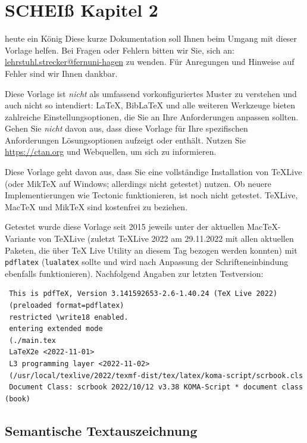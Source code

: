 

\lstset{language=C}

\chapter{SCHEIß Kapitel 2 }

heute ein König
Diese kurze Dokumentation soll Ihnen beim Umgang mit dieser Vorlage helfen. Bei Fragen oder Fehlern bitten wir Sie, sich an: \href{mailto:lehrstuhl.strecker@fernuni-hagen}{lehrstuhl.strecker@fernuni-hagen} zu wenden. Für Anregungen und Hinweise auf Fehler sind wir Ihnen dankbar.

Diese Vorlage ist \emph{nicht} als umfassend vorkonfiguriertes Muster zu verstehen und auch nicht so intendiert: LaTeX, BibLaTeX und alle weiteren Werkzeuge bieten zahlreiche Einstellungsoptionen, die Sie an Ihre Anforderungen anpassen sollten. Gehen Sie \emph{nicht} davon aus, dass diese Vorlage für Ihre spezifischen Anforderungen Lösungsoptionen aufzeigt oder enthält. Nutzen Sie \url{https://ctan.org} und Webquellen, um sich zu informieren.

Diese Vorlage geht davon aus, dass Sie eine vollständige Installation von TeXLive (oder MikTeX auf Windows; allerdings nicht getestet) nutzen. Ob neuere Implementierungen wie Tectonic funktionieren, ist noch nicht getestet. TeXLive, MacTeX und MikTeX sind kostenfrei zu beziehen.

Getestet wurde diese Vorlage seit 2015 jeweils unter der aktuellen MacTeX-Variante von TeXLive (zuletzt TeXLive 2022 am 29.11.2022 mit allen aktuellen Paketen, die über TeX Live Utility an diesem Tag bezogen werden konnten) mit \verb|pdflatex| (\verb|lualatex| sollte und wird nach Anpassung der Schrifteneinbindung ebenfalls funktionieren). Nachfolgend Angaben zur letzten Testversion:

\begin{verbatim}
 This is pdfTeX, Version 3.141592653-2.6-1.40.24 (TeX Live 2022) 
 (preloaded format=pdflatex)
 restricted \write18 enabled.
 entering extended mode
 (./main.tex
 LaTeX2e <2022-11-01>
 L3 programming layer <2022-11-02>
 (/usr/local/texlive/2022/texmf-dist/tex/latex/koma-script/scrbook.cls
 Document Class: scrbook 2022/10/12 v3.38 KOMA-Script * document class (book)

\end{verbatim}




\section{Semantische Textauszeichnung}
\label{sec:semant-textauszeichnung}

